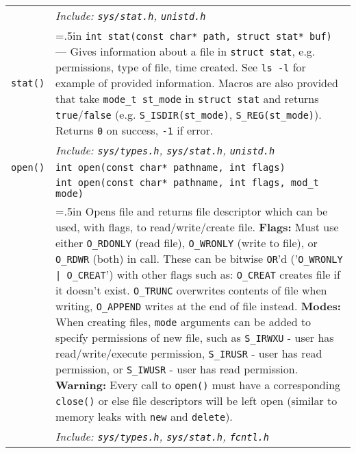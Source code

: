 \documentclass{article}
\newcommand{\indenth}[1][.5]{\hangindent=#1in
                         \hangafter=1 }
\begin{document}
\begin{longtabu}{|p{.9in}|p{6.3in}<{\strut}|}
    & \hspace{.5in}\it Include: \rm\texttt{sys/stat.h}, \texttt{unistd.h} 
        \\ %
    \texttt{stat()} & \indenth\texttt{int stat(const char* path,  struct stat* buf)} --- Gives information about a file in \texttt{struct stat}, e.g. permissions, type of file, time created. See \texttt{ls -l} for example of provided information. Macros are also provided that take \texttt{mode\_t st\_mode} in \texttt{struct stat} and returns \texttt{true}/\texttt{false} (e.g. \texttt{S\_ISDIR(st\_mode)}, \texttt{S\_REG(st\_mode)}). Returns \texttt{0} on success, \texttt{-1} if error.
        \\
    & \hspace{.5in}\it Include: \rm\texttt{sys/types.h}, \texttt{sys/stat.h}, \texttt{unistd.h}
        \\ \hline
    \texttt{open()} & \texttt{int open(const char* pathname, int flags)}
        \\
    & \texttt{int open(const char* pathname, int flags, mod\_t mode)}
        \\
    & \indenth\hspace{.5in}Opens file and returns file descriptor which can be used, with flags, to read/write/create file. 
    \newline\textbf{Flags:} Must use either \texttt{O\_RDONLY} (read file), \texttt{O\_WRONLY} (write to file), or \texttt{O\_RDWR} (both) in call. These can be bitwise \texttt{OR}'d ('\texttt{O\_WRONLY | O\_CREAT}') with other flags such as:  \texttt{O\_CREAT} creates file if it doesn't exist. \texttt{O\_TRUNC} overwrites contents of file when writing, \texttt{O\_APPEND} writes at the end of file instead. 
    \newline\textbf{Modes:} When creating files, \texttt{mode} arguments can be added to specify permissions of new file, such as \texttt{S\_IRWXU} - user has read/write/execute permission, \texttt{S\_IRUSR} - user has read permission, or \texttt{S\_IWUSR} - user has read permission.
    \newline\textbf{Warning:} Every call to \texttt{open()} must have a corresponding \texttt{close()} or else file descriptors will be left open (similar to memory leaks with \texttt{new} and \texttt{delete}).
        \\
    & \hspace{.5in}\it Include: \rm\texttt{sys/types.h}, \texttt{sys/stat.h}, \texttt{fcntl.h}
        \\

\end{longtabu}
\end{document}
